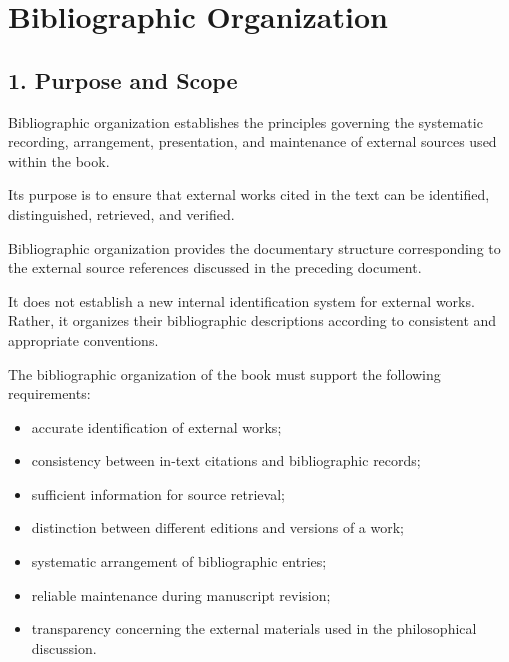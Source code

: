 
\cleardoublepage

\section*{Bibliographic Organization}

{}


\subsection*{1. Purpose and Scope}

Bibliographic organization establishes
the principles governing the systematic
recording, arrangement, presentation,
and maintenance of external sources
used within the book.

Its purpose is to ensure that external
works cited in the text can be identified,
distinguished, retrieved, and verified.

Bibliographic organization provides
the documentary structure corresponding
to the external source references
discussed in the preceding document.

It does not establish a new internal
identification system for external
works. Rather, it organizes their
bibliographic descriptions according
to consistent and appropriate
conventions.

The bibliographic organization of
the book must support the following
requirements:

\begin{itemize}
    \item accurate identification
    of external works;
    \item consistency between
    in-text citations and
    bibliographic records;
    \item sufficient information
    for source retrieval;
    \item distinction between
    different editions and
    versions of a work;
    \item systematic arrangement
    of bibliographic entries;
    \item reliable maintenance
    during manuscript revision;
    \item transparency concerning
    the external materials used
    in the philosophical discussion.
\end{itemize}

